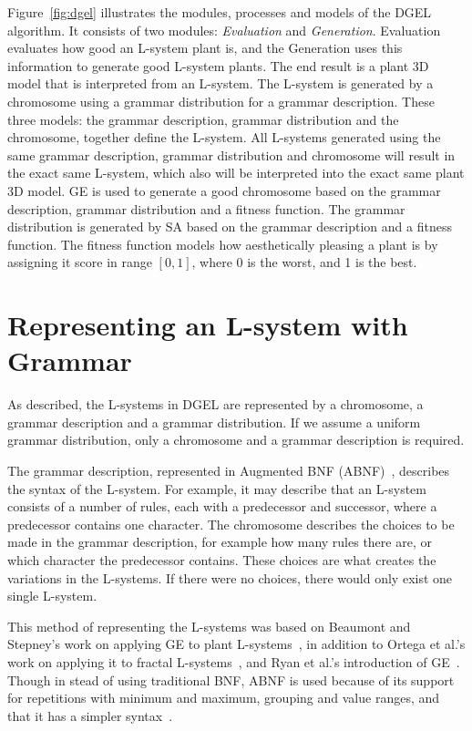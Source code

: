 Figure~\ref{fig:dgel} illustrates the modules, processes and models of the \gls{DGEL} algorithm.
It consists of two modules: \textit{Evaluation} and \textit{Generation}.
Evaluation evaluates how good an \gls{L-system} plant is, and the Generation uses this information to generate good \gls{L-system} plants.
The end result is a plant 3D model that is interpreted from an \gls{L-system}.
The \gls{L-system} is generated by a chromosome using a grammar distribution for a grammar description.
These three models: the grammar description, grammar distribution and the chromosome, together define the \gls{L-system}.
All \glspl{L-system} generated using the same grammar description, grammar distribution and chromosome will result in the exact same \gls{L-system}, which also will be interpreted into the exact same plant 3D model.
\gls{GE} is used to generate a good chromosome based on the grammar description, grammar distribution and a fitness function.
The grammar distribution is generated by \gls{SA} based on the grammar description and a fitness function.
The fitness function models how aesthetically pleasing a plant is by assigning it score in range $[0, 1]$, where 0 is the worst, and 1 is the best.

\section{Representing an L-system with Grammar}
\label{sec:grammar}
As described, the \glspl{L-system} in \gls{DGEL} are represented by a chromosome, a grammar description and a grammar distribution.
If we assume a uniform grammar distribution, only a chromosome and a grammar description is required.

The grammar description, represented in Augmented BNF (ABNF)~\cite{RFC5234}, describes the syntax of the \gls{L-system}.
For example, it may describe that an \gls{L-system} consists of a number of rules, each with a predecessor and successor, where a predecessor contains one character.
The chromosome describes the choices to be made in the grammar description, for example how many rules there are, or which character the predecessor contains.
These choices are what creates the variations in the \glspl{L-system}.
If there were no choices, there would only exist one single \gls{L-system}.

This method of representing the \glspl{L-system} was based on Beaumont and Stepney's work on applying \gls{GE} to plant \glspl{L-system}~\cite{2009Beaumont}, in addition to Ortega et al.'s work on applying it to fractal \glspl{L-system}~\cite{2003Ortega}, and Ryan et al.'s introduction of \gls{GE}~\cite{1998Ryan}.
Though in stead of using traditional BNF, ABNF is used because of its support for repetitions with minimum and maximum, grouping and value ranges, and that it has a simpler syntax~\cite{RFC5234}.

